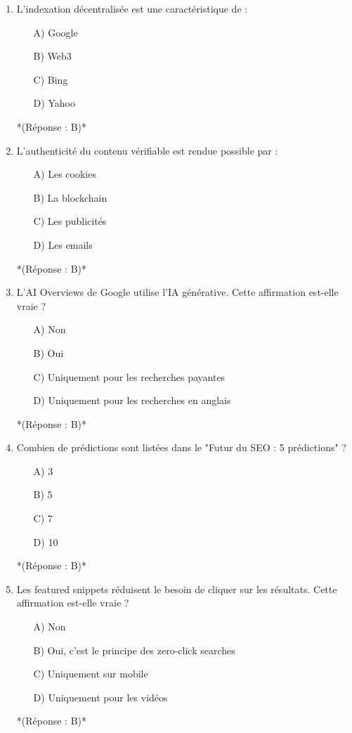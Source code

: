 \documentclass[12pt,a4paper,twoside]{report}
\begin{document}
\begin{enumerate}
    \item L'indexation décentralisée est une caractéristique de :
    \begin{itemize}
        \item[A)] Google
        \item[B)] Web3
        \item[C)] Bing
        \item[D)] Yahoo
    \end{itemize}
    *(Réponse : B)*

    \item L'authenticité du contenu vérifiable est rendue possible par :
    \begin{itemize}
        \item[A)] Les cookies
        \item[B)] La blockchain
        \item[C)] Les publicités
        \item[D)] Les emails
    \end{itemize}
    *(Réponse : B)*

    \item L'AI Overviews de Google utilise l'IA générative. Cette affirmation est-elle vraie ?
    \begin{itemize}
        \item[A)] Non
        \item[B)] Oui
        \item[C)] Uniquement pour les recherches payantes
        \item[D)] Uniquement pour les recherches en anglais
    \end{itemize}
    *(Réponse : B)*

    \item Combien de prédictions sont listées dans le "Futur du SEO : 5 prédictions" ?
    \begin{itemize}
        \item[A)] 3
        \item[B)] 5
        \item[C)] 7
        \item[D)] 10
    \end{itemize}
    *(Réponse : B)*

    \item Les featured snippets réduisent le besoin de cliquer sur les résultats. Cette affirmation est-elle vraie ?
    \begin{itemize}
        \item[A)] Non
        \item[B)] Oui, c'est le principe des zero-click searches
        \item[C)] Uniquement sur mobile
        \item[D)] Uniquement pour les vidéos
    \end{itemize}
    *(Réponse : B)*


\end{enumerate}
\end{document}
